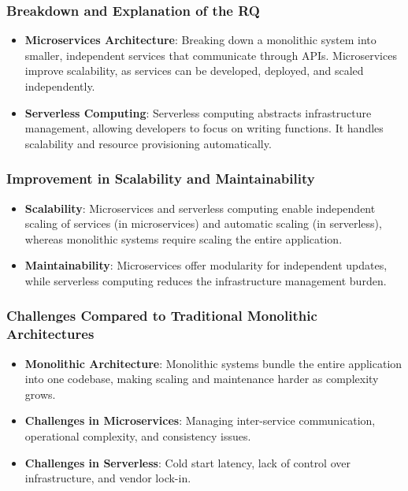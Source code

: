 \documentclass[a4paper, 12pt]{article}
\begin{document}
\subsubsection{Breakdown and Explanation of the RQ}
\begin{itemize}
    \item \textbf{Microservices Architecture}: Breaking down a monolithic system into smaller, independent services that communicate through APIs. Microservices improve scalability, as services can be developed, deployed, and scaled independently.
    \item \textbf{Serverless Computing}: Serverless computing abstracts infrastructure management, allowing developers to focus on writing functions. It handles scalability and resource provisioning automatically.
\end{itemize}

\subsubsection{Improvement in Scalability and Maintainability}
\begin{itemize}
    \item \textbf{Scalability}: Microservices and serverless computing enable independent scaling of services (in microservices) and automatic scaling (in serverless), whereas monolithic systems require scaling the entire application.
    \item \textbf{Maintainability}: Microservices offer modularity for independent updates, while serverless computing reduces the infrastructure management burden.
\end{itemize}

\subsubsection{Challenges Compared to Traditional Monolithic Architectures}
\begin{itemize}
    \item \textbf{Monolithic Architecture}: Monolithic systems bundle the entire application into one codebase, making scaling and maintenance harder as complexity grows.
    \item \textbf{Challenges in Microservices}: Managing inter-service communication, operational complexity, and consistency issues.
    \item \textbf{Challenges in Serverless}: Cold start latency, lack of control over infrastructure, and vendor lock-in.
\end{itemize}
\end{document}
